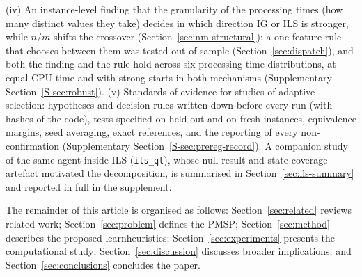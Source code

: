 \documentclass[final,3p,times,11pt,authoryear]{elsarticle}
\begin{document}
(iv) An instance-level finding that the granularity of the processing times (how
many distinct values they take) decides in which direction IG or ILS is stronger,
while $n/m$ shifts the crossover (Section~\ref{sec:nm-structural}); a one-feature
rule that chooses between them was tested out of sample (Section~\ref{sec:dispatch}),
and both the finding and the rule hold across six processing-time distributions,
at equal CPU time and with strong starts in both mechanisms (Supplementary
Section~\ref{S-sec:robust}).
(v) Standards of evidence for studies of adaptive selection: hypotheses and
decision rules written down before every run (with hashes of the code), tests
specified on held-out and on fresh instances, equivalence margins, seed
averaging, exact references, and the reporting of every non-confirmation
(Supplementary Section~\ref{S-sec:prereg-record}). A companion study of the same
agent inside ILS (\texttt{ils\_ql}), whose null result and state-coverage artefact
motivated the decomposition, is summarised in Section~\ref{sec:ils-summary} and
reported in full in the supplement.

The remainder of this article is organised as follows:
Section~\ref{sec:related} reviews related work; Section~\ref{sec:problem}
defines the PMSP; Section~\ref{sec:method} describes the proposed
learnheuristics; Section~\ref{sec:experiments} presents the
computational study; Section~\ref{sec:discussion} discusses broader
implications; and Section~\ref{sec:conclusions} concludes the paper.


\end{document}
